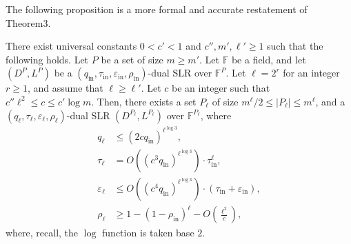 The following proposition is a more formal and accurate restatement of Theorem3.
\begin{ntproposition}
There exist universal constants $0<c'<1$ and $c'',m',\ell'\geq1$ such that the following holds. Let $P$ be a set of size $m\geq m'$. Let $\mathbb F$ be a field, and let $(D^P,L^P)$ be a $(q_{\mathrm{in}},\tau_{\mathrm{in}},\varepsilon_{\mathrm{in}},\rho_{\mathrm{in}})$-dual SLR over $\mathbb F^P$. Let $\ell=2^r$ for an integer $r\geq1$, and assume that $\ell\geq\ell'$. Let $c$ be an integer such that $c''\ell^2\leq c\leq c'\log m$. Then, there exists a set $P_\ell$ of size $m^\ell/2\leq|P_\ell|\leq m^\ell$, and a $(q_\ell,\tau_\ell,\varepsilon_\ell,\rho_\ell)$-dual SLR $(D^{P_\ell},L^{P_\ell})$ over $\mathbb F^{P_\ell}$, where
\begin{align*}q_\ell&\leq(2cq_{\mathrm{in}})^{\ell^{\log3}},\\\tau_\ell&=O((c^3q_{\mathrm{in}})^{\ell^{\log3}})\cdot\tau_{\mathrm{in}}^\ell,\\\varepsilon_\ell&\leq O((c^4q_{\mathrm{in}})^{\ell^{\log3}})\cdot(\tau_{\mathrm{in}}+\varepsilon_{\mathrm{in}}),\\\rho_\ell&\geq1-(1-\rho_{\mathrm{in}})^\ell-O\left(\frac{\ell^2}c\right),\end{align*}
where, recall, the $\log$ function is taken base $2$.
\end{ntproposition}
